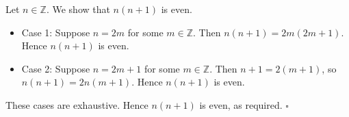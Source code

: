 Let $n \in \mathbb{Z}$.
We show that $n(n + 1)$ is even.

\begin{itemize}
  \item Case 1: Suppose $n = 2m$ for some $m \in \mathbb{Z}$.
    Then $n(n + 1) = 2m(2m + 1)$.
    Hence $n(n + 1)$ is even.
  \item Case 2: Suppose $n = 2m + 1$ for some $m \in \mathbb{Z}$.
    Then $n + 1 = 2(m + 1)$, so $n(n + 1) = 2n(m + 1)$.
    Hence $n(n + 1)$ is even.
\end{itemize}

These cases are exhaustive.
Hence $n(n + 1)$ is even, as required. \hfill$\square$